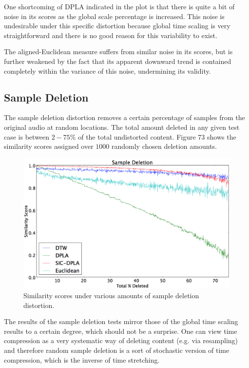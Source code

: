 \documentclass[12pt]{report} 	%
\numberwithin{figure}{chapter}
\numberwithin{table}{chapter}
\numberwithin{equation}{chapter}
\begin{document}
\begin{flushleft}
One shortcoming of DPLA indicated in the plot is that there is quite a bit of noise in its scores as the global scale percentage is increased. This noise is undesirable under this specific distortion because global time scaling is very straightforward and there is no good reason for this variability to exist.

The aligned-Euclidean measure suffers from similar noise in its scores, but is further weakened by the fact that its apparent downward trend is contained completely within the variance of this noise, undermining its validity.

\subsection{Sample Deletion}
The sample deletion distortion removes a certain percentage of samples from the original audio at random locations. The total amount deleted in any given test case is between $2-75\%$ of the total undistorted content. Figure 73 shows the similarity scores assigned over $1000$ randomly chosen deletion amounts.
\begin{figure}[h!]
\begin{center}
\includegraphics[scale=0.5,width=\linewidth]{SampleDeletion}
\caption[Sample deletion results]{Similarity scores under various amounts of sample deletion distortion.}
\end{center}
\end{figure}
The results of the sample deletion tests mirror those of the global time scaling results to a certain degree, which should not be a surprise. One can view time compression as a very systematic way of deleting content (e.g. via resampling) and therefore random sample deletion is a sort of stochastic version of time compression, which is the inverse of time stretching. 


\end{flushleft}
\end{document}
